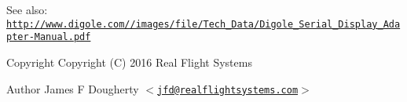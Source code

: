 \-See also\-: \href{http://www.digole.com//images/file/Tech_Data/Digole_Serial_Display_Adapter-Manual.pdf}{\tt http\-://www.\-digole.\-com//images/file/\-Tech\-\_\-\-Data/\-Digole\-\_\-\-Serial\-\_\-\-Display\-\_\-\-Adapter-\/\-Manual.\-pdf}

\begin{DoxyCopyright}{\-Copyright}
\-Copyright (\-C) 2016 \-Real \-Flight \-Systems 
\end{DoxyCopyright}
\begin{DoxyAuthor}{\-Author}
\-James \-F \-Dougherty $<$\href{mailto:jfd@realflightsystems.com}{\tt jfd@realflightsystems.\-com}$>$ 
\end{DoxyAuthor}
